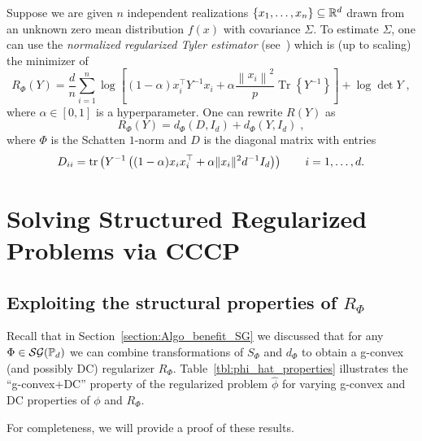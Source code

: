 \documentclass[sn-nature]{sn-jnl}%
\theoremstyle{thmstyleone}%
\theoremstyle{thmstyletwo}%
\theoremstyle{thmstylethree}%
\begin{document}
\begin{example}\label{example:regularized_tyler_estimator} Suppose we are given $n$ independent realizations $\{x_1, \ldots, x_n\} \subseteq \mathbb{R}^d$ drawn from an unknown zero mean distribution $f(x)$ with covariance $\Sigma$. To estimate $\Sigma$, one can use the \textit{normalized regularized Tyler estimator} (see~\cite[Section 4.2.3]{structuredcovestimation_wiesel}) which is (up to scaling) the minimizer  of 
\[
R_\Phi(Y) =\frac{d}{n} \sum_{i=1}^n \log \left[(1-\alpha) x_i^\top Y^{-1} x_i+\alpha \frac{\left\|x_i\right\|^2}{p} \operatorname{Tr}\left\{Y^{-1}\right\}\right]+\log \det Y \; ,
\]
where $\alpha \in [0,1]$ is a hyperparameter.
One can rewrite $R(Y)$ as 
\[
R_\Phi(Y) = d_\Phi(D, I_d) + d_\Phi(Y, I_d) \; ,
\]
where $\Phi$ is the Schatten $1$-norm and $D$ is the diagonal matrix with entries $$D_{ii} = \text{tr} \left(Y^{-1}\left((1-\alpha) x_i x_i^\top + \alpha \|x_i\|^2 d^{-1} I_d \right) \right) \qquad i = 1, \ldots, d.$$
\end{example}


\section{Solving Structured Regularized Problems via CCCP}

\subsection{Exploiting the structural properties of $R_\Phi$}
\label{sec:4.1}
Recall that in Section~\ref{section:Algo_benefit_SG} we discussed that for any $\Phi \in \mathcal{SG}(\mathbb{P}_d)$ we can combine transformations of $S_\Phi$ and $d_\Phi$ to obtain a g-convex (and possibly DC) regularizer $R_\Phi$. %
Table~\ref{tbl:phi_hat_properties} illustrates the ``g-convex+DC'' property of the regularized problem $\hat{\phi}$ for varying g-convex and DC properties of $\phi$ and $R_\Phi$. 


For completeness, we will provide a proof of these results. 
\end{document}
